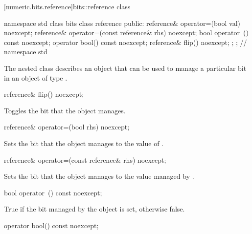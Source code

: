 [numeric.bits.reference]{bits::reference class}

\begin{codeblock}
namespace std {
  class bits {
    class reference {	
    public:
      reference& operator=(bool val) noexcept;
      reference& operator=(const reference& rhs) noexcept;
      bool operator~() const noexcept;
      operator bool() const noexcept;
      reference& flip() noexcept;
    };  
  };
} // namespace std
\end{codeblock}

The nested class  describes an object that can be used to manage a particular bit in an object of type .

\begin{itemdecl}
reference& flip() noexcept;	
\end{itemdecl}

\begin{itemdescr}
\effects Toggles the bit that the object manages.	
\end{itemdescr}

\begin{itemdecl}
reference& operator=(bool rhs) noexcept;	
\end{itemdecl}

\begin{itemdescr}
\effects Sets the bit that the object manages to the value of .	
\end{itemdescr}

\begin{itemdecl}
reference& operator=(const reference& rhs) noexcept;	
\end{itemdecl}

\begin{itemdescr}
\effects Sets the bit that the object manages to the value managed by .
\end{itemdescr}

\begin{itemdecl}
bool operator~() const noexcept;	
\end{itemdecl}

\begin{itemdescr}
\returns True if the bit managed by the object is set, otherwise false.	
\end{itemdescr}

\begin{itemdecl}
operator bool() const noexcept;	
\end{itemdecl}

